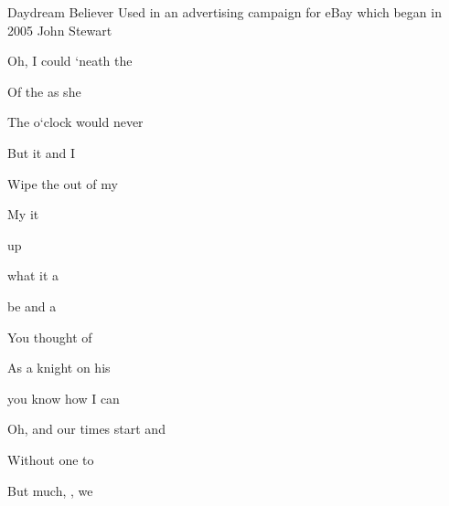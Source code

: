 \begin{SBSong}{Daydream Believer}
  {Used in an advertising campaign for eBay which began in 2005}
  {John Stewart}
  \begin{SBVerse}
    Oh, I could  `neath the 
    
    Of the  as she 
    
    The  o`clock  would never  
    
    But it  and I 
    
    Wipe the  out of my 
    
    My     it 
  \end{SBVerse}
  \WBPageBrk
  \begin{SBChorus}
     up  
    
     what  it   a
    
     be and a
       
       
  \end{SBChorus}
  \begin{SBVerse}
    You  thought of 
    
    As a  knight on his 
    
     you know how  I can  
    
    Oh, and our  times start and 
    
    Without  one to 
    
    But  much, ,  we  
  \end{SBVerse}
\end{SBSong}
